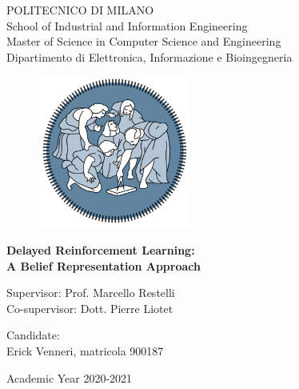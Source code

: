 \begin{titlepage}
    \vspace*{-1.5cm}
    \begin{center}
        \Large
        POLITECNICO DI MILANO\\
        \large
        School of Industrial and Information Engineering\\
        Master of Science in Computer Science and Engineering\\
        \normalsize
        Dipartimento di Elettronica, Informazione e Bioingegneria
        
        \vspace*{1.5cm}
        \begin{figure}[htbp]
            \begin{center}
                \includegraphics[width=5cm]{images/logopolimi.png}
            \end{center}
        \end{figure}
        
        \vspace*{0.5cm}
        \LARGE
        \textbf{Delayed Reinforcement Learning:\\A Belief Representation Approach}\\

        \vspace*{.75truecm}
    \end{center}
    
    \vspace*{3.0cm}
    \large
    
    \begin{flushleft}
        Supervisor: Prof. Marcello Restelli\\
        Co-supervisor: Dott. Pierre Liotet
    \end{flushleft}
    
    \vspace*{1.0cm}
    
    \begin{flushright}
        Candidate:\\
        Erick Venneri, matricola 900187\\
    \end{flushright}
    
    \vspace*{1cm}
    \begin{center}
        Academic Year 2020-2021
    \end{center}

\end{titlepage}
